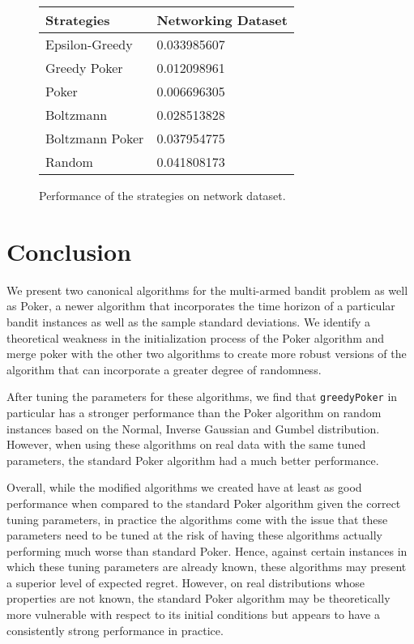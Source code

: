 \documentclass[12pt]{article}
\begin{document}
\begin{figure}
\begin{center}
    \begin{tabular}{| l | l |}
    \hline
    Strategies & Networking Dataset \\ \hline
    Epsilon-Greedy & 0.033985607\\ \hline
    Greedy Poker & 0.012098961 \\ \hline
    Poker & 0.006696305 \\ \hline
    Boltzmann & 0.028513828 \\ \hline
    Boltzmann Poker & 0.037954775 \\ \hline 
    Random & 0.041808173 \\ \hline
    \hline
    \end{tabular}
\end{center}  
\caption{Performance of the strategies on network dataset.}
\end{figure}

\section{Conclusion}

We present two canonical algorithms for the multi-armed bandit problem as well as Poker, a newer algorithm that incorporates the time horizon of a particular bandit instances as well as the sample standard deviations. We identify a theoretical weakness in the initialization process of the Poker algorithm and merge poker with the other two algorithms to create more robust versions of the algorithm that can incorporate a greater degree of randomness.

After tuning the parameters for these algorithms, we find that \texttt{greedyPoker} in particular has a stronger performance than the Poker algorithm on random instances based on the Normal, Inverse Gaussian and Gumbel distribution. However, when using these algorithms on real data with the same tuned parameters, the standard Poker algorithm had a much better performance.

Overall, while the modified algorithms we created have at least as good performance when compared to the standard  Poker algorithm given the correct tuning parameters, in practice the algorithms come with the issue that these parameters need to be tuned at the risk of having these algorithms actually performing much worse than standard Poker. Hence, against certain instances in which these tuning parameters are already known, these algorithms may present a superior level of expected regret. However, on real distributions whose properties are not known, the standard Poker algorithm may be theoretically more vulnerable with respect to its initial conditions but appears to have a consistently strong performance in practice.



\end{document}
